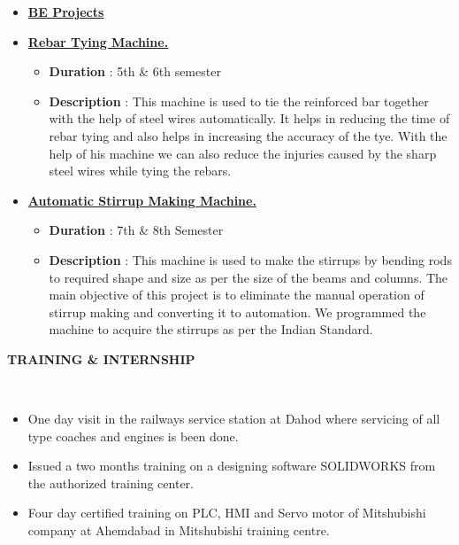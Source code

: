 \documentclass[a4paper,10pt]{article}
\newcommand{\isep}{-2 pt}
\newcommand{\lsep}{-0.5cm}
\newcommand{\resheading}[1]{{\small \colorbox{mygrey}{\begin{minipage}{0.975\textwidth}{\textbf{#1 \vphantom{p\^{E}}}}\end{minipage}}}}
\begin{document}
\begin{itemize}
\item \underline{\Large{\textbf{BE Projects}}}\\
\end{itemize}
    \begin{itemize}
    \begin{itemize}
    \item \underline{\textbf{Rebar Tying Machine.}} \\
	\begin{itemize}\itemsep \isep
	\item \textbf{Duration} : 5th \& 6th semester
	\item \textbf{Description} : This machine is used to tie the reinforced bar together with the help of steel wires automatically. It helps in reducing the time of rebar tying and also helps in increasing the accuracy of the tye. With the help of his machine we can also reduce the injuries caused by the sharp steel wires while tying the rebars.
	\end{itemize}	
	
\item \underline{\textbf{Automatic Stirrup Making Machine.}}\\
	\begin{itemize}\itemsep \isep
	\item \textbf{Duration} : 7th \& 8th Semester
	\item \textbf{Description} : This machine is used to make the stirrups by bending rods to required shape and size as per the size of the beams and columns. The main objective of this project is to eliminate the manual operation of stirrup making and converting it to automation. We programmed the machine to acquire the stirrups as per the Indian Standard.
	\end{itemize}
	\end{itemize}
\end{itemize}


\resheading{\textbf{\Large{TRAINING \& INTERNSHIP}}}\\[\lsep]
\begin{itemize}
\item \noindent One day visit in the railways service station at Dahod where servicing of all type coaches and engines is been done.
\end{itemize}
\begin{itemize}
\item \noindent Issued a two months training on a designing software SOLIDWORKS from the authorized training center.
\end{itemize}
\begin{itemize}
    \item \noindent Four day certified training on PLC, HMI and Servo motor of Mitshubishi company at Ahemdabad in Mitshubishi training centre.
\end{itemize}
\end{document}
